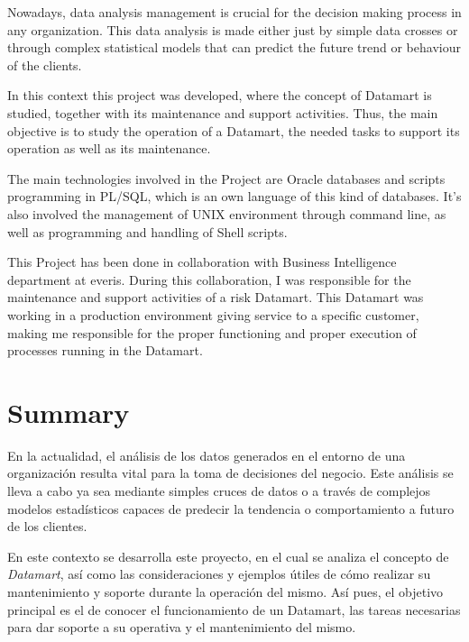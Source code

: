 \documentclass[a4paper, 12pt]{book}
\begin{document}
Nowadays, data analysis management is crucial for the decision making process in any organization. This data analysis is made either just by simple data crosses or through complex statistical models that can predict the future trend or behaviour of the clients.

In this context this project was developed, where the concept of Datamart is studied, together with its maintenance and support activities. Thus, the main objective is to study the operation of a Datamart, the needed tasks to support its operation as well as its maintenance.

The main technologies involved in the Project are Oracle databases and scripts programming in PL/SQL, which is an own language of this kind of databases. It's also involved the management of UNIX environment through command line, as well as programming and handling of Shell scripts.

This Project has been done in collaboration with Business Intelligence department at everis. During this collaboration, I was responsible for the maintenance and support activities of a risk Datamart. This Datamart was working in a production environment giving service to a specific customer, making me responsible for the proper functioning and proper execution of processes running in the Datamart.


\chapter*{Summary}

En la actualidad, el análisis de los datos generados en el entorno de una organización resulta vital para la toma de decisiones del negocio. Este análisis se lleva a cabo ya sea mediante simples cruces de datos o a través de complejos modelos estadísticos capaces de predecir la tendencia o comportamiento a futuro de los clientes.

En este contexto se desarrolla este proyecto, en el cual se analiza el concepto de \textit{Datamart}, así como las consideraciones y ejemplos útiles de cómo realizar su mantenimiento y soporte durante la operación del mismo. Así pues, el objetivo principal es el de conocer el funcionamiento de un Datamart, las tareas necesarias para dar soporte a su operativa y el mantenimiento del mismo.
\end{document}
